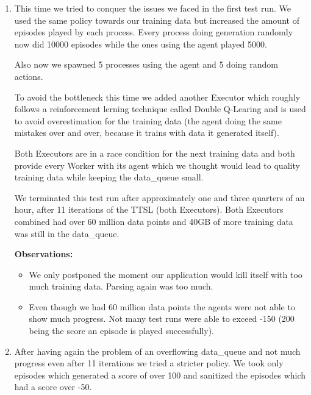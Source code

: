 \begin{enumerate}
\begin{itemize}
        \end{itemize}

  \item This time we tried to conquer the issues we faced
        in the first test run. We used the same policy
        towards our training data but increased the amount
        of episodes played by each process. Every process
        doing generation randomly now did 10000 episodes
        while the ones using the agent played 5000.

        Also now we spawned 5 processes using the agent and
        5 doing random actions.

        To avoid the bottleneck this time we added another
        Executor which roughly follows a reinforcement
        lerning technique called Double Q-Learing and is
        used to avoid overestimation for the training data
        (the agent doing the same mistakes over and over,
        because it trains with data it generated itself).
        \cite{jonas1}

        Both Executors are in a race condition for the next
        training data and both provide every Worker with
        its agent which we thought would lead to quality
        training data while keeping the data\_queue small.

        We terminated this test run after approximately
        one and three quarters of an hour, after 11
        iterations of the TTSL (both Executors). Both
        Executors combined had over 60 million data points
        and 40GB of more training data was still in the
        data\_queue.

        \textbf{Observations:}

        \begin{itemize}

          \item We only postponed the moment our
                application would kill itself with too much
                training data. Parsing again was too much.

          \item Even though we had 60 million data points
                the agents were not able to show much
                progress. Not many test runs were able to
                exceed -150 (200 being the score an episode
                is played successfully).

        \end{itemize}

  \item After having again the problem of an overflowing
        data\_queue and not much progress even after 11
        iterations we tried a stricter policy. We took only
        episodes which generated a score of over 100 and
        sanitized the episodes which had a score over -50.


\end{enumerate}
